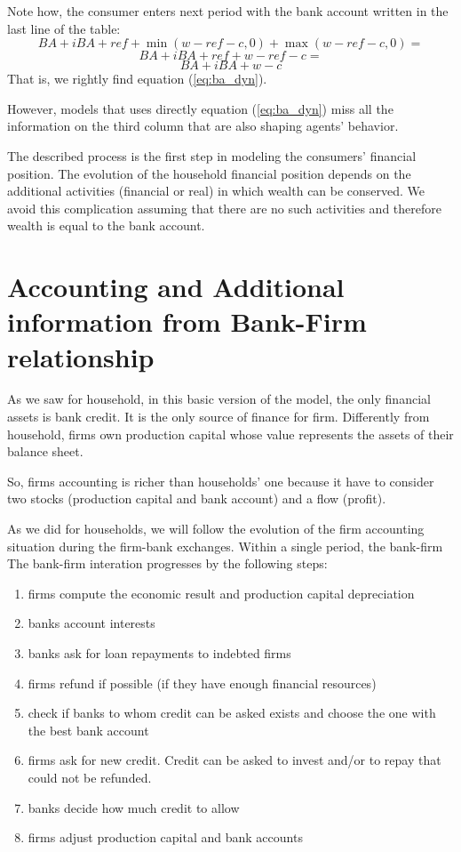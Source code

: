 \documentclass{article}
\begin{document}
Note how, the consumer enters next period with the bank account written in the last line of the table:
\[BA+iBA+ref+\min(w-ref-c,0)+\max(w-ref-c,0)=\]
\[BA+iBA+ref+w-ref-c=\]
\[BA+iBA+w-c\]
That is, we rightly find equation (\ref{eq:ba_dyn}).

However, models that uses directly equation (\ref{eq:ba_dyn}) miss all the information on the third column that are also shaping agents' behavior.

The described process is the first step in modeling the consumers' financial position. The evolution of the household financial position depends on the additional activities (financial or real) in which wealth can be conserved. We avoid this complication assuming that there are no such activities and therefore wealth is equal to the bank account. 

\section{Accounting and Additional information from Bank-Firm relationship}
As we saw for household, in this basic version of the model, the only financial assets is bank credit. It is the only source of finance for firm.
Differently from household, firms own production capital whose value represents the assets of their balance sheet.

So, firms accounting is richer than households' one because it have to consider two stocks (production capital and bank account) and a flow (profit).

As we did for households, we will follow the evolution of the firm accounting situation during the firm-bank exchanges. Within a single period, the bank-firm The bank-firm interation progresses by the following steps:

\begin{enumerate}
	\item firms compute the economic result and production capital depreciation
	\item banks account interests
	\item banks ask for loan repayments to indebted firms
	\item firms refund if possible (if they have enough financial resources)
	\item check if banks to whom credit can be asked exists and choose the one with
the best bank account
	\item firms ask for new credit. Credit can be asked to invest and/or to repay that could not be refunded.
	\item banks decide how much credit to allow
	\item firms adjust production capital and bank accounts
\end{enumerate}
\end{document}
